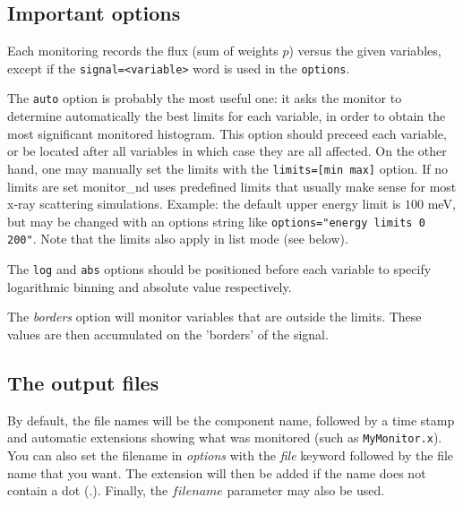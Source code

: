 \subsection{Important options}

Each monitoring records the flux (sum of weights $p$) versus the
given variables, except if the \verb+signal=<variable>+ word is used in the \verb+options+.

The \verb+auto+ option is probably the most useful one: it asks the monitor to
determine automatically the best limits for each variable, in order to obtain
the most significant monitored histogram. This option should preceed each
variable, or be located after all variables in which case they are all
affected.
On the other hand, one may manually set the limits with the \verb+limits=[min max]+ option.
If no limits are set monitor\_nd uses predefined limits that usually make sense for most x-ray scattering simulations. Example: the default upper energy limit is $100$ meV, but may be changed with an options string like
\verb+options="energy limits 0 200"+. Note that the limits also apply in list mode (see below).

The \verb+log+ and \verb+abs+ options should be positioned before each variable to specify logarithmic binning and absolute value respectively.

The \textit{borders} option will monitor variables that are outside
the limits. These values are then accumulated on the 'borders' of the
signal.

\subsection{The output files}

By default, the file names will be the component name, followed by a time stamp and
automatic extensions showing what was monitored (such as
\texttt{MyMonitor.x}). You can also set the filename in \textit{options}
with the \textit{file} keyword followed by the file name that you want. The
extension will then be added if the name does not contain a dot (.).
Finally, the $filename$ parameter may also be used.

